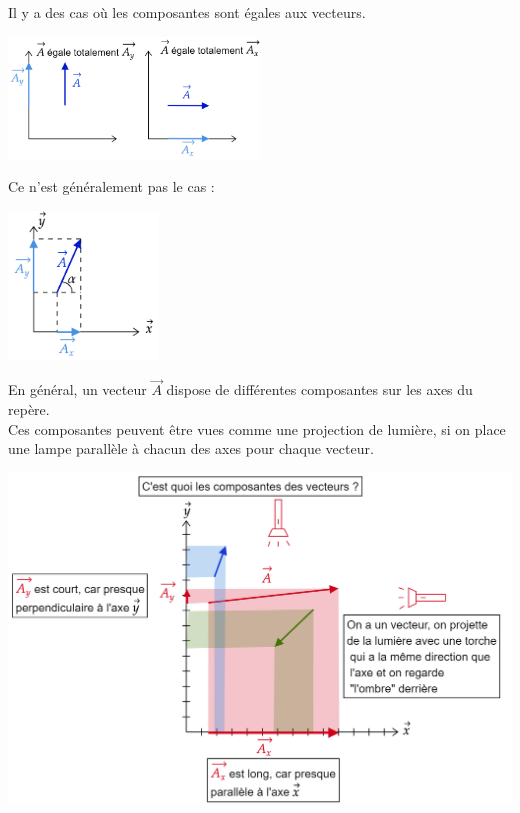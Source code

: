 \documentclass[12pt]{article}
\begin{document}
Il y a des cas où les composantes sont égales aux vecteurs.

            \begin{center}
            \includegraphics[width=0.5\textwidth]{DD6.png}
            \end{center}

Ce n'est généralement pas le cas :

            \begin{center}
            \includegraphics[width=0.3\textwidth]{DD7.png}
            \end{center}

En général, un vecteur $\Vec{A}$ dispose de différentes composantes sur les axes du repère. \\ Ces composantes peuvent être vues comme une projection de lumière, si on place une lampe parallèle à chacun des axes pour chaque vecteur.

            \begin{center}
            \includegraphics[width=1\textwidth]{DD81.png}
            \end{center}
\end{document}
